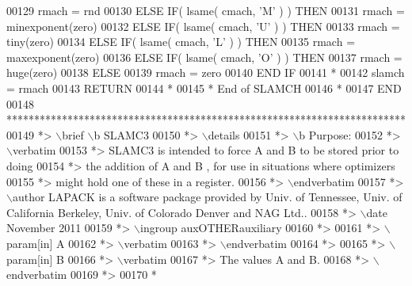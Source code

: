 \begin{DoxyCode}
00129          rmach = rnd
00130       \textcolor{keywordflow}{ELSE} \textcolor{keywordflow}{IF}( lsame( cmach, \textcolor{stringliteral}{'M'} ) ) \textcolor{keywordflow}{THEN}
00131          rmach = minexponent(zero)
00132       \textcolor{keywordflow}{ELSE} \textcolor{keywordflow}{IF}( lsame( cmach, \textcolor{stringliteral}{'U'} ) ) \textcolor{keywordflow}{THEN}
00133          rmach = tiny(zero)
00134       \textcolor{keywordflow}{ELSE} \textcolor{keywordflow}{IF}( lsame( cmach, \textcolor{stringliteral}{'L'} ) ) \textcolor{keywordflow}{THEN}
00135          rmach = maxexponent(zero)
00136       \textcolor{keywordflow}{ELSE} \textcolor{keywordflow}{IF}( lsame( cmach, \textcolor{stringliteral}{'O'} ) ) \textcolor{keywordflow}{THEN}
00137          rmach = huge(zero)
00138       \textcolor{keywordflow}{ELSE}
00139          rmach = zero
00140 \textcolor{keywordflow}{      END IF}
00141 \textcolor{comment}{*}
00142       slamch = rmach
00143       \textcolor{keywordflow}{RETURN}
00144 \textcolor{comment}{*}
00145 \textcolor{comment}{*     End of SLAMCH}
00146 \textcolor{comment}{*}
00147 \textcolor{keyword}{      END}
00148 \textcolor{comment}{************************************************************************}
00149 \textcolor{comment}{*> \(\backslash\)brief \(\backslash\)b SLAMC3}
00150 \textcolor{comment}{*> \(\backslash\)details}
00151 \textcolor{comment}{*> \(\backslash\)b Purpose:}
00152 \textcolor{comment}{*> \(\backslash\)verbatim}
00153 \textcolor{comment}{*> SLAMC3  is intended to force  A  and  B  to be stored prior to doing}
00154 \textcolor{comment}{*> the addition of  A  and  B ,  for use in situations where optimizers}
00155 \textcolor{comment}{*> might hold one of these in a register.}
00156 \textcolor{comment}{*> \(\backslash\)endverbatim}
00157 \textcolor{comment}{*> \(\backslash\)author LAPACK is a software package provided by Univ. of Tennessee, Univ. of California Berkeley, Univ.
       of Colorado Denver and NAG Ltd..}
00158 \textcolor{comment}{*> \(\backslash\)date November 2011}
00159 \textcolor{comment}{*> \(\backslash\)ingroup auxOTHERauxiliary}
00160 \textcolor{comment}{*>}
00161 \textcolor{comment}{*> \(\backslash\)param[in] A}
00162 \textcolor{comment}{*> \(\backslash\)verbatim}
00163 \textcolor{comment}{*> \(\backslash\)endverbatim}
00164 \textcolor{comment}{*>}
00165 \textcolor{comment}{*> \(\backslash\)param[in] B}
00166 \textcolor{comment}{*> \(\backslash\)verbatim}
00167 \textcolor{comment}{*>          The values A and B.}
00168 \textcolor{comment}{*> \(\backslash\)endverbatim}
00169 \textcolor{comment}{*>}
00170 \textcolor{comment}{*}

\end{DoxyCode}

